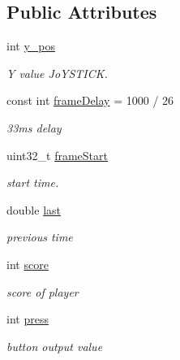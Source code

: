 \subsection*{Public Attributes}
\begin{DoxyCompactItemize}
\item 
\hypertarget{class_c_pong_a1dae5c9ec589eb86e275a0470095f530}{}\label{class_c_pong_a1dae5c9ec589eb86e275a0470095f530} 
int \hyperlink{class_c_pong_a1dae5c9ec589eb86e275a0470095f530}{y\+\_\+pos}
\begin{DoxyCompactList}\small\item\em Y value Jo\+Y\+S\+T\+I\+CK. \end{DoxyCompactList}\item 
\hypertarget{class_c_pong_a3aa66544f80bed43ebffeb3c2711521e}{}\label{class_c_pong_a3aa66544f80bed43ebffeb3c2711521e} 
const int \hyperlink{class_c_pong_a3aa66544f80bed43ebffeb3c2711521e}{frame\+Delay} = 1000 / 26
\begin{DoxyCompactList}\small\item\em 33ms delay \end{DoxyCompactList}\item 
\hypertarget{class_c_pong_a460ef9c18d512e61e8b277aaf9c2db12}{}\label{class_c_pong_a460ef9c18d512e61e8b277aaf9c2db12} 
uint32\+\_\+t \hyperlink{class_c_pong_a460ef9c18d512e61e8b277aaf9c2db12}{frame\+Start}
\begin{DoxyCompactList}\small\item\em start time. \end{DoxyCompactList}\item 
\hypertarget{class_c_pong_a1432a4e6bcd2cfc7eb567e9c5dc2f136}{}\label{class_c_pong_a1432a4e6bcd2cfc7eb567e9c5dc2f136} 
double \hyperlink{class_c_pong_a1432a4e6bcd2cfc7eb567e9c5dc2f136}{last}
\begin{DoxyCompactList}\small\item\em previous time \end{DoxyCompactList}\item 
\hypertarget{class_c_pong_aa9bb35ee26e1722e574f8629d381445b}{}\label{class_c_pong_aa9bb35ee26e1722e574f8629d381445b} 
int \hyperlink{class_c_pong_aa9bb35ee26e1722e574f8629d381445b}{score}
\begin{DoxyCompactList}\small\item\em score of player \end{DoxyCompactList}\item 
\hypertarget{class_c_pong_a2da2c577ed7dd0ecea96221c3dd4e5a4}{}\label{class_c_pong_a2da2c577ed7dd0ecea96221c3dd4e5a4} 
int \hyperlink{class_c_pong_a2da2c577ed7dd0ecea96221c3dd4e5a4}{press}
\begin{DoxyCompactList}\small\item\em button output value \end{DoxyCompactList}\end{DoxyCompactItemize}


